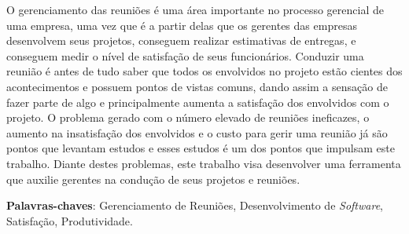 \begin{resumo}

 O gerenciamento das reuniões é uma área importante no processo gerencial de uma empresa, uma vez que é a partir delas que os gerentes das empresas desenvolvem seus projetos, conseguem realizar estimativas de entregas, e conseguem medir o nível de satisfação de seus funcionários. Conduzir uma reunião é antes de tudo saber que todos os envolvidos no projeto estão cientes dos acontecimentos e possuem pontos de vistas comuns, dando assim a sensação de fazer parte de algo e principalmente aumenta a satisfação dos envolvidos com o projeto. O problema gerado com o número elevado de reuniões ineficazes, o aumento na insatisfação dos envolvidos e o custo para gerir uma reunião já são pontos que levantam estudos e esses estudos é um dos pontos que impulsam este trabalho. Diante destes problemas, este trabalho visa desenvolver uma ferramenta que auxilie gerentes na condução de seus projetos e reuniões. 

 \vspace{\onelineskip}

 \noindent
 \textbf{Palavras-chaves}: Gerenciamento de Reuniões, Desenvolvimento de \textit{Software}, Satisfação, Produtividade.
\end{resumo}
